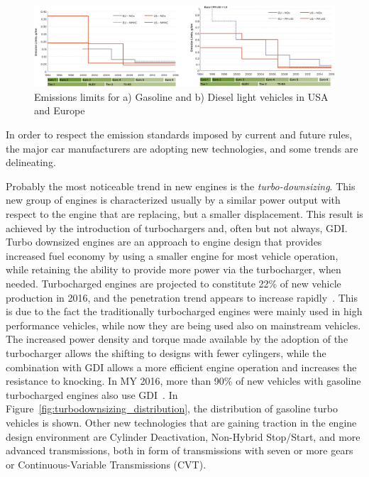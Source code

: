\begin{figure}[ht]
  \centering
  \includegraphics[width=\textwidth]{figures/review/emissions_levels.png}
  \caption{Emissions limits for a) Gasoline and b) Diesel light vehicles in USA and Europe\label{fig:emission_levels} }
\end{figure}

In order to respect the emission standards imposed by current and future rules, the major car manufacturers are adopting new technologies, and some trends are delineating. 

Probably the most noticeable trend in new engines is the \emph{turbo-downsizing}. This new group of engines is characterized usually by a similar power output with respect to the engine that are replacing, but a smaller displacement. This result is achieved by the introduction of turbochargers and, often but not always, GDI. Turbo downsized engines are an approach to engine design that provides increased fuel economy by using a smaller engine for most vehicle operation, while retaining the ability to provide more power via the turbocharger, when needed. Turbocharged engines are projected to constitute 22\% of new vehicle production in 2016, and the penetration trend appears to increase rapidly~\cite{EPA2016}. This is due to the fact the traditionally turbocharged engines were mainly used in high performance vehicles, while now they are being used also on mainstream vehicles. The increased power density and torque made available by the adoption of the turbocharger allows the shifting to designs with fewer cylingers, while the combination with GDI allows a more efficient engine operation and increases the resistance to knocking. In MY 2016, more than 90\% of new vehicles with gasoline turbocharged engines also use GDI~\cite{EPA2016}. In Figure~\ref{fig:turbodownsizing_distribution}, the distribution of gasoline turbo vehicles is shown. Other new technologies that are gaining traction in the engine design environment are Cylinder Deactivation, Non-Hybrid Stop/Start, and more advanced transmissions, both in form of transmissions with seven or more gears or Continuous-Variable Transmissions (CVT).


